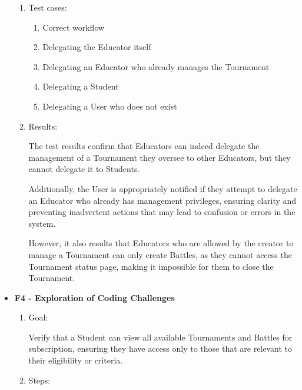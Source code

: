 \documentclass{Configuration_Files/Template}
\begin{document}
\begin{itemize}
\begin{enumerate}
        \item Test cases:
        
        \begin{enumerate}
        
            \item Correct workflow
            \item Delegating the Educator itself
            \item Delegating an Educator who already manages the Tournament
            \item Delegating a Student
            \item Delegating a User who does not exist
    
        \end{enumerate}
        
        \item Results:
        
        The test results confirm that Educators can indeed delegate the management of a Tournament they oversee to other Educators, but they cannot delegate it to Students.
        
        Additionally, the User is appropriately notified if they attempt to delegate an Educator who already has management privileges, ensuring clarity and preventing inadvertent actions that may lead to confusion or errors in the system.

        However, it also results that Educators who are allowed by the creator to manage a Tournament can only create Battles, as they cannot access the Tournament status page, making it impossible for them to close the Tournament.\\
    
    \end{enumerate}
    
    \item \textbf{F4 - Exploration of Coding Challenges}
    
    \begin{enumerate}
    
        \item Goal:
        
        Verify that a Student can view all available Tournaments and Battles for subscription, ensuring they have access only to those that are relevant to their eligibility or criteria.
        
        \item Steps:
        

\end{enumerate}
\end{itemize}
\end{document}
